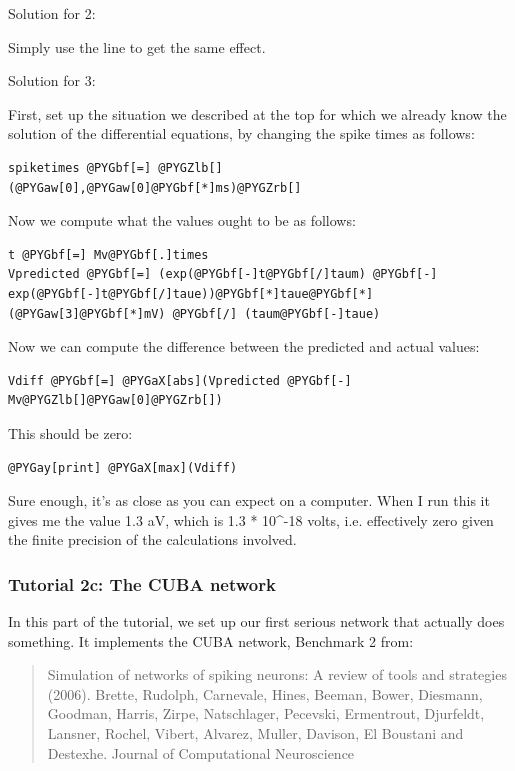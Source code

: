 \documentclass[letterpaper,10pt,english]{manual}
\begin{document}
Solution for 2:

Simply use the line  to get the same effect.

Solution for 3:

First, set up the situation we described at the top for which we
already know the solution of the differential equations, by changing
the spike times as follows:

\begin{Verbatim}[commandchars=@\[\]]
spiketimes @PYGbf[=] @PYGZlb[](@PYGaw[0],@PYGaw[0]@PYGbf[*]ms)@PYGZrb[]
\end{Verbatim}

Now we compute what the values ought to be as follows:

\begin{Verbatim}[commandchars=@\[\]]
t @PYGbf[=] Mv@PYGbf[.]times
Vpredicted @PYGbf[=] (exp(@PYGbf[-]t@PYGbf[/]taum) @PYGbf[-] exp(@PYGbf[-]t@PYGbf[/]taue))@PYGbf[*]taue@PYGbf[*](@PYGaw[3]@PYGbf[*]mV) @PYGbf[/] (taum@PYGbf[-]taue)
\end{Verbatim}

Now we can compute the difference between the predicted and actual values:

\begin{Verbatim}[commandchars=@\[\]]
Vdiff @PYGbf[=] @PYGaX[abs](Vpredicted @PYGbf[-] Mv@PYGZlb[]@PYGaw[0]@PYGZrb[])
\end{Verbatim}

This should be zero:

\begin{Verbatim}[commandchars=@\[\]]
@PYGay[print] @PYGaX[max](Vdiff)
\end{Verbatim}

Sure enough, it's as close as you can expect on a computer. When I run this
it gives me the value 1.3 aV, which is 1.3 * 10\textasciicircum{}-18 volts, i.e. effectively
zero given the finite precision of the calculations involved.

\resetcurrentobjects
\hypertarget{--doc-tutorial_2c_the_cuba_network}{}

\subsubsection{Tutorial 2c: The CUBA network}

In this part of the tutorial, we set up our first serious network
that actually does something. It implements the CUBA network, Benchmark 2 from:
\begin{quote}

Simulation of networks of spiking neurons: A review of tools and strategies (2006).
Brette, Rudolph, Carnevale, Hines, Beeman, Bower, Diesmann, Goodman, Harris, Zirpe,
Natschlager, Pecevski, Ermentrout, Djurfeldt, Lansner, Rochel, Vibert, Alvarez, Muller,
Davison, El Boustani and Destexhe.
Journal of Computational Neuroscience
\end{quote}
\end{document}
